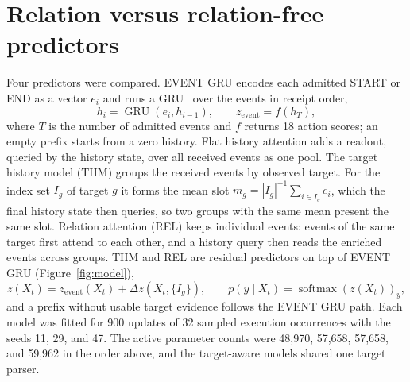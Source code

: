 \section{Relation versus relation-free predictors}
\label{sec:app-relations}

Four predictors were compared. EVENT GRU encodes each admitted START or
END as a vector $e_i$ and runs a GRU~\cite{cho2014gru} over the events in
receipt order,
\begin{equation}
  h_i = \operatorname{GRU}(e_i,h_{i-1}),
  \qquad z_{\mathrm{event}} = f(h_T),
  \label{eq:eventgru}
\end{equation}
where $T$ is the number of admitted events and $f$ returns 18 action
scores; an empty prefix starts from a zero history. Flat history
attention adds a readout, queried by the history state, over all
received events as one pool. The target history model (THM) groups the
received events by observed target. For the index set $I_g$ of target
$g$ it forms the mean slot $m_g = |I_g|^{-1}\sum_{i\in I_g} e_i$, which
the final history state then queries, so two groups with the same mean
present the same slot. Relation attention (REL) keeps individual events:
events of the same target first attend to each other, and a history
query then reads the enriched events across groups. THM and REL are
residual predictors on top of EVENT GRU (Figure~\ref{fig:model}),
\begin{equation}
  z(X_t) = z_{\mathrm{event}}(X_t) + \Delta z(X_t,\{I_g\}),
  \qquad p(y\mid X_t) = \operatorname{softmax}(z(X_t))_y ,
  \label{eq:relation}
\end{equation}
and a prefix without usable target evidence follows the EVENT GRU path.
Each model was fitted for 900 updates of 32 sampled execution
occurrences with the seeds 11, 29, and 47. The active parameter counts
were 48,970, 57,658, 57,658, and 59,962 in the order above, and the
target-aware models shared one target parser.

